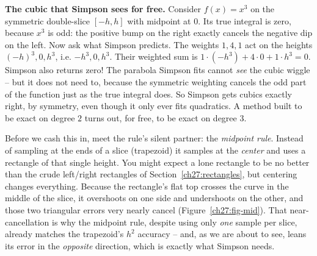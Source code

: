 \begin{intuitionbox}
\textbf{The cubic that Simpson sees for free.} Consider $f(x) = x^3$ on the symmetric double-slice $[-h, h]$ with midpoint at $0$. Its true integral is zero, because $x^3$ is odd: the positive bump on the right exactly cancels the negative dip on the left. Now ask what Simpson predicts. The weights $1,4,1$ act on the heights $(-h)^3, 0, h^3$, i.e. $-h^3, 0, h^3$. Their weighted sum is $1\cdot(-h^3) + 4\cdot 0 + 1\cdot h^3 = 0$. Simpson also returns zero! The parabola Simpson fits cannot \emph{see} the cubic wiggle -- but it does not need to, because the symmetric weighting cancels the odd part of the function just as the true integral does. So Simpson gets cubics exactly right, by symmetry, even though it only ever fits quadratics. A method built to be exact on degree $2$ turns out, for free, to be exact on degree $3$.
\end{intuitionbox}

Before we cash this in, meet the rule's silent partner: the \emph{midpoint rule}. Instead of sampling at the ends of a slice (trapezoid) it samples at the \emph{center} and uses a rectangle of that single height. You might expect a lone rectangle to be no better than the crude left/right rectangles of Section~\ref{ch27:rectangles}, but centering changes everything. Because the rectangle's flat top crosses the curve in the middle of the slice, it overshoots on one side and undershoots on the other, and those two triangular errors very nearly cancel (Figure~\ref{ch27:fig-mid}). That near-cancellation is why the midpoint rule, despite using only \emph{one} sample per slice, already matches the trapezoid's $h^2$ accuracy -- and, as we are about to see, leans its error in the \emph{opposite} direction, which is exactly what Simpson needs.

